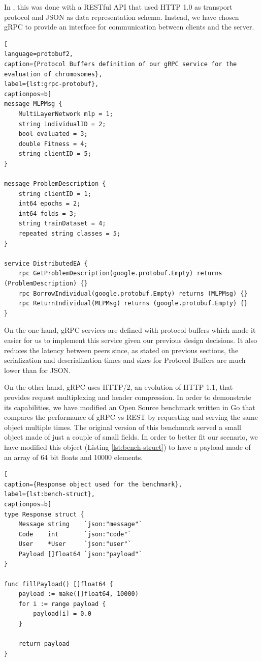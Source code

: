 In \cite{paper-pool-jj}, this was done with a RESTful API that used HTTP 1.0 as transport protocol and JSON as data representation schema. Instead, we have chosen gRPC \cite{grpc} to provide an interface for communication between clients and the server.

\begin{lstlisting}[
language=protobuf2,
caption={Protocol Buffers definition of our gRPC service for the evaluation of chromosomes},
label={lst:grpc-protobuf},
captionpos=b]
message MLPMsg {
    MultiLayerNetwork mlp = 1;
    string individualID = 2;
    bool evaluated = 3;
    double Fitness = 4;
    string clientID = 5;
}

message ProblemDescription {
    string clientID = 1;
    int64 epochs = 2;
    int64 folds = 3;
    string trainDataset = 4;
    repeated string classes = 5;
}

service DistributedEA {
    rpc GetProblemDescription(google.protobuf.Empty) returns (ProblemDescription) {}
    rpc BorrowIndividual(google.protobuf.Empty) returns (MLPMsg) {}
    rpc ReturnIndividual(MLPMsg) returns (google.protobuf.Empty) {}
}
\end{lstlisting}

On the one hand, gRPC services are defined with protocol buffers which made it easier for us to implement this service given our previous design decisions. It also reduces the latency between peers since, as stated on previous sections, the serialization and deserialization times and sizes for Protocol Buffers are much lower than for JSON.

On the other hand, gRPC uses HTTP/2, an evolution of HTTP 1.1, that provides request multiplexing and header compression. In order to demonstrate its capabilities, we have modified an Open Source benchmark \cite{rest-vs-grpc-bench} written in Go that compares the performance of gRPC vs REST by requesting and serving the same object multiple times. The original version of this benchmark served a small object made of just a couple of small fields. In order to better fit our scenario, we have modified this object (Listing \ref{lst:bench-struct}) to have a payload made of an array of 64 bit floats and 10000 elements.

\begin{lstlisting}[
caption={Response object used for the benchmark},
label={lst:bench-struct},
captionpos=b]
type Response struct {
	Message string    `json:"message"`
	Code    int       `json:"code"`
	User    *User     `json:"user"`
	Payload []float64 `json:"payload"`
}

func fillPayload() []float64 {
	payload := make([]float64, 10000)
	for i := range payload {
		payload[i] = 0.0
	}

	return payload
}
\end{lstlisting}

